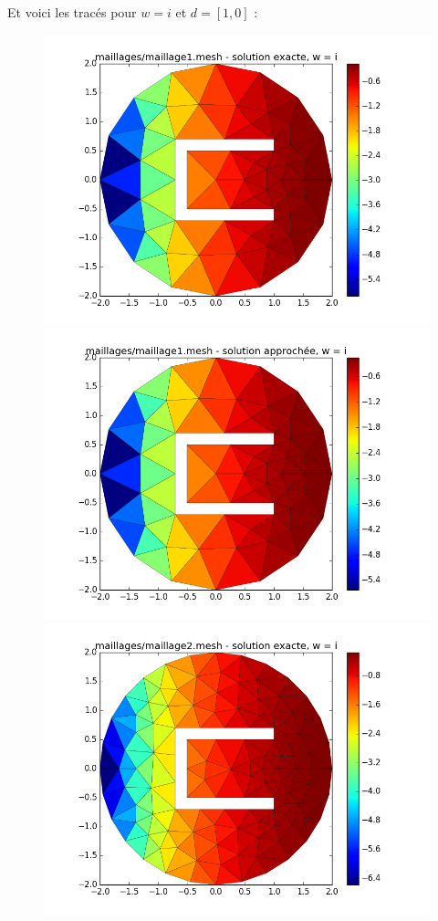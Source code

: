 \documentclass[a4paper,12pt]{article}
\begin{document}
\newpage

Et voici les tracés pour $w = i$ et $d = [1,0]$ :
\begin{figure}[H]
\begin{center}
        \includegraphics[scale = 0.3]{image/1j/figure_1}
        \includegraphics[scale = 0.3]{image/1j/figure_1-1}
        \includegraphics[scale = 0.3]{image/1j/figure_2}

\end{center}
\end{figure}
\end{document}
